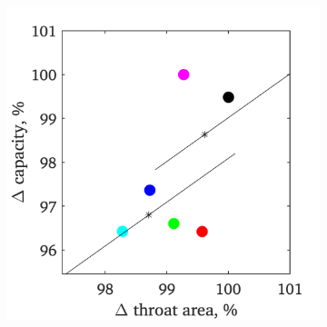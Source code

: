 \documentclass[a4paper, 11pt, oneside]{report}
\begin{document}
\begin{figure}[H]
	\centering
	\begin{subfigure}{.45\textwidth}
		\centering
		\includegraphics[width=\linewidth]{figs/T900_3d_capacities_vs_throat_areas.png}
	\end{subfigure}
	\begin{subfigure}{.1125\textwidth}
		\centering

\end{subfigure}
\end{figure}
\end{document}
